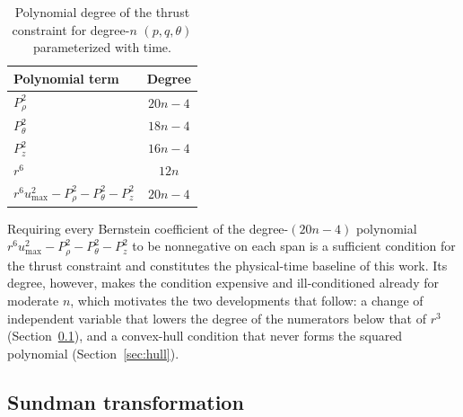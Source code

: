 \documentclass[a4paper,fleqn]{cas-sc}
\begin{document}
\begin{table}[htbp]
	\centering
	\caption{Polynomial degree of the thrust constraint for degree-$n$
	$(p,q,\theta)$ parameterized with time.}
	\label{tab:thrust-certificate-degrees}
	\begin{tabular}{lc}
		\toprule
		\textbf{Polynomial term} & \textbf{Degree} \\
		\midrule
		$P_\rho^{2}$   & $20n-4$ \\
		$P_\theta^{2}$ & $18n-4$ \\
		$P_z^{2}$      & $16n-4$ \\
		$r^6$      & $12n$   \\
		\midrule
		$r^6 u_{\max}^2-P_\rho^{2}-P_\theta^{2}-P_z^{2}$
		& $20n-4$ \\
		\bottomrule
	\end{tabular}
\end{table}

Requiring every Bernstein coefficient of the degree-$(20n-4)$ polynomial
$r^6u_{\max}^2-P_\rho^{2}-P_\theta^{2}-P_z^{2}$ to be nonnegative on each span
is a sufficient condition for the thrust constraint and constitutes the
physical-time baseline of this work. Its degree, however, makes the condition
expensive and ill-conditioned already for moderate $n$, which motivates the
two developments that follow: a change of independent variable that lowers
the degree of the numerators below that of $r^3$
(Section~\ref{sec:sundman}), and a convex-hull condition that never forms the
squared polynomial (Section~\ref{sec:hull}).

\subsection{Sundman transformation}
\label{sec:sundman}
\end{document}
